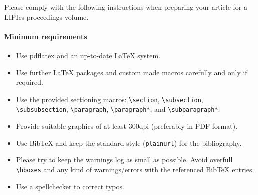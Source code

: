 \documentclass[a4paper,UKenglish,cleveref, autoref, thm-restate]{lipics-v2021}
\begin{document}
Please comply with the following instructions when preparing your article for a LIPIcs proceedings volume.
\paragraph*{Minimum requirements}

\begin{itemize}
\item Use pdflatex and an up-to-date \LaTeX{} system.
\item Use further \LaTeX{} packages and custom made macros carefully and only if required.
\item Use the provided sectioning macros: \verb+\section+, \verb+\subsection+, \verb+\subsubsection+, \linebreak \verb+\paragraph+, \verb+\paragraph*+, and \verb+\subparagraph*+.
\item Provide suitable graphics of at least 300dpi (preferably in PDF format).
\item Use BibTeX and keep the standard style (\verb+plainurl+) for the bibliography.
\item Please try to keep the warnings log as small as possible. Avoid overfull \verb+\hboxes+ and any kind of warnings/errors with the referenced BibTeX entries.
\item Use a spellchecker to correct typos.
\end{itemize}
\end{document}

